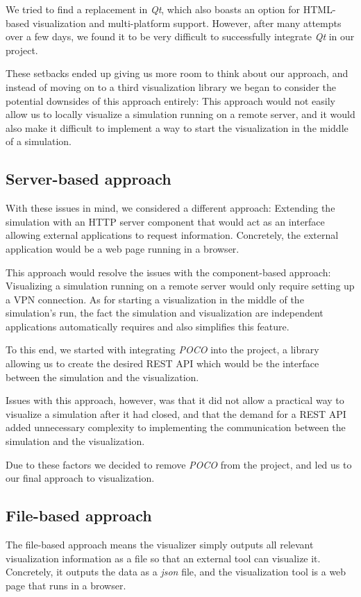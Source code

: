 \documentclass[a4paper,12pt]{article}
\begin{document}
We tried to find a replacement in \textit{Qt}, which also boasts an option for HTML-based visualization and multi-platform support. However, after many attempts over a few days, we found it to be very difficult to successfully integrate \textit{Qt} in our project.

These setbacks ended up giving us more room to think about our approach, and instead of moving on to a third visualization library we began to consider the potential downsides of this approach entirely: This approach would not easily allow us to locally visualize a simulation running on a remote server, and it would also make it difficult to implement a way to start the visualization in the middle of a simulation.

\subsection{Server-based approach}
With these issues in mind, we considered a different approach: Extending the simulation with an HTTP server component that would act as an interface allowing external applications to request information. Concretely, the external application would be a web page running in a browser.

This approach would resolve the issues with the component-based approach: Visualizing a simulation running on a remote server would only require setting up a VPN connection. As for starting a visualization in the middle of the simulation's run, the fact the simulation and visualization are independent applications automatically requires and also simplifies this feature.

To this end, we started with integrating \textit{POCO} into the project, a library allowing us to create the desired REST API which would be the interface between the simulation and the visualization.

Issues with this approach, however, was that it did not allow a practical way to visualize a simulation after it had closed, and that the demand for a REST API added unnecessary complexity to implementing the communication between the simulation and the visualization.

Due to these factors we decided to remove \textit{POCO} from the project, and led us to our final approach to visualization.

\subsection{File-based approach}
The file-based approach means the visualizer simply outputs all relevant visualization information as a file so that an external tool can visualize it. Concretely, it outputs the data as a \textit{json} file, and the visualization tool is a web page that runs in a browser.
\end{document}
